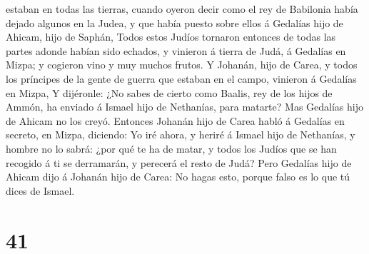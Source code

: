 estaban en todas las tierras, cuando oyeron decir como el rey de
Babilonia había dejado algunos en la Judea, y que había puesto sobre
ellos á Gedalías hijo de Ahicam, hijo de Saphán,  Todos
estos Judíos tornaron entonces de todas las partes adonde habían sido
echados, y vinieron á tierra de Judá, á Gedalías en Mizpa; y cogieron
vino y muy muchos frutos.  Y Johanán, hijo de Carea, y
todos los príncipes de la gente de guerra que estaban en el campo,
vinieron á Gedalías en Mizpa,  Y dijéronle: ¿No sabes de
cierto como Baalis, rey de los hijos de Ammón, ha enviado á Ismael hijo
de Nethanías, para matarte? Mas Gedalías hijo de Ahicam no los creyó.
 Entonces Johanán hijo de Carea habló á Gedalías en
secreto, en Mizpa, diciendo: Yo iré ahora, y heriré á Ismael hijo de
Nethanías, y hombre no lo sabrá: ¿por qué te ha de matar, y todos los
Judíos que se han recogido á ti se derramarán, y perecerá el resto de
Judá?  Pero Gedalías hijo de Ahicam dijo á Johanán hijo de
Carea: No hagas esto, porque falso es lo que tú dices de Ismael.

\hypertarget{section-40}{%
\section{41}\label{section-40}}

